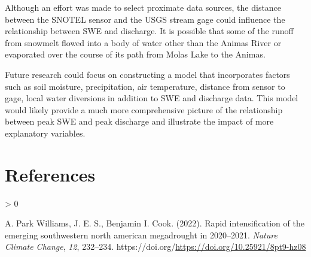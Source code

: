 \documentclass[
  12pt,
]{article}
\newlength{\cslhangindent}
\newenvironment{CSLReferences}[2] %
 {%
  \setlength{\parindent}{0pt}
  \ifodd #1 \everypar{\setlength{\hangindent}{\cslhangindent}}\ignorespaces\fi
  \ifnum #2 > 0
  \setlength{\parskip}{#2\baselineskip}
  \fi
 }%
 {}
\begin{document}
Although an effort was made to select proximate data sources, the
distance between the SNOTEL sensor and the USGS stream gage could
influence the relationship between SWE and discharge. It is possible
that some of the runoff from snowmelt flowed into a body of water other
than the Animas River or evaporated over the course of its path from
Molas Lake to the Animas.

Future research could focus on constructing a model that incorporates
factors such as soil moisture, precipitation, air temperature, distance
from sensor to gage, local water diversions in addition to SWE and
discharge data. This model would likely provide a much more
comprehensive picture of the relationship between peak SWE and peak
discharge and illustrate the impact of more explanatory variables.

\newpage

\hypertarget{references}{%
\section*{References}\label{references}}

\hypertarget{refs}{}
\begin{CSLReferences}{1}{0}
\leavevmode\hypertarget{ref-WILLIAMS2022232}{}%
A. Park Williams, J. E. S., Benjamin I. Cook. (2022). Rapid
intensification of the emerging southwestern north american megadrought
in 2020--2021. \emph{Nature Climate Change}, \emph{12}, 232--234.
https://doi.org/\url{https://doi.org/10.25921/8pt9-hz08}

\end{CSLReferences}
\end{document}
